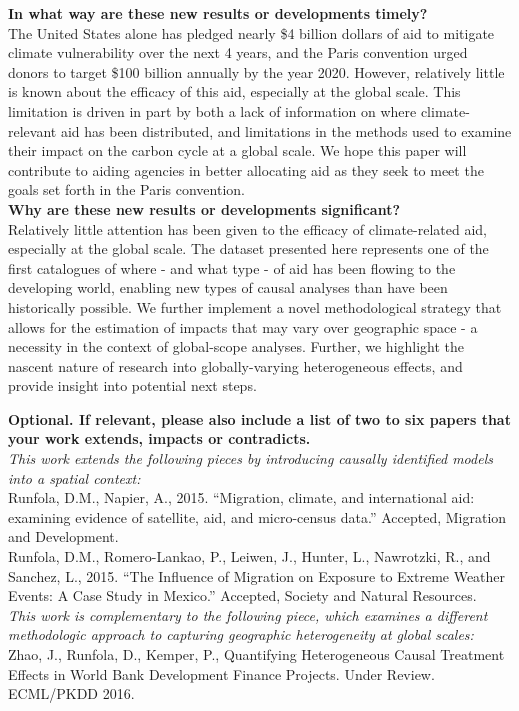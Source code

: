 \documentclass[11pt,a4paper,roman]{moderncv}        %
\begin{document}
\textbf{In what way are these new results or developments timely?}\\
The United States alone has pledged nearly \$4 billion dollars of aid to mitigate climate vulnerability over the next 4 years, and the Paris convention urged donors to target \$100 billion annually by the year 2020.  However, relatively little is known about the efficacy of this aid, especially at the global scale.  This limitation is driven in part by both a lack of information on where climate-relevant aid has been distributed, and limitations in the methods used to examine their impact on the carbon cycle at a global scale.  We hope this paper will contribute to aiding agencies in better allocating aid as they seek to meet the goals set forth in the Paris convention.\\
\vspace{4 mm}
\textbf{Why are these new results or developments significant?}\\
Relatively little attention has been given to the efficacy of climate-related aid, especially at the global scale.  The dataset presented here represents one of the first catalogues of where - and what type - of aid has been flowing to the developing world, enabling new types of causal analyses than have been historically possible.  We further implement a novel methodological strategy that allows for the estimation of impacts that may vary over geographic space - a necessity in the context of global-scope analyses.  Further, we highlight the nascent nature of research into globally-varying heterogeneous effects, and provide insight into potential next steps.
\vspace{4 mm}

\textbf{Optional. If relevant, please also include a list of two to six papers that your work extends, impacts or contradicts.}\\
\textit{This work extends the following pieces by introducing causally identified models into a spatial context:}\\
Runfola, D.M., Napier, A., 2015. “Migration, climate, and international aid: examining evidence of satellite, aid, and micro-census data.”  Accepted, Migration and Development. \\
Runfola, D.M., Romero-Lankao, P., Leiwen, J., Hunter, L., Nawrotzki, R., and Sanchez, L., 2015. “The Influence of Migration on Exposure to Extreme Weather Events: A Case Study in Mexico.” Accepted, Society and Natural Resources.\\
\textit{This work is complementary to the following piece, which examines a different methodologic approach to capturing geographic heterogeneity at global scales:}\\
Zhao, J., Runfola, D., Kemper, P., Quantifying Heterogeneous Causal Treatment Effects in World Bank Development Finance Projects. Under Review. ECML/PKDD 2016.




\vspace{0.5cm}


\makeletterclosing
\end{document}
